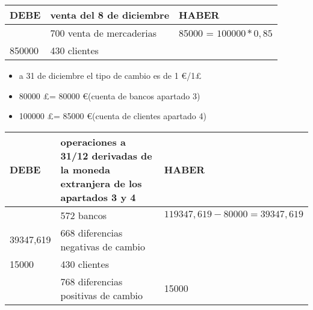 \documentclass[a4paper,12pt]{article}
\begin{document}
\begin{table}[H]
    \centering
    \begin{tabular}{|p{3cm}|p{6cm}|p{3cm}|}
    \hline
    \textbf{DEBE} & \textbf{venta del 8 de diciembre} & \textbf{HABER} \\
    \hline
    & 700 venta de mercaderias & 85000 = $100000*0,85$\\
    \hline
    850000& 430 clientes & \\
    \hline
    \end{tabular}
\end{table}


\begin{itemize}
    \item a 31 de diciembre el tipo de cambio es de 1 \euro/1\pounds
    \item 80000 \pounds = 80000 \euro (cuenta de bancos apartado 3)
    \item 100000 \pounds = 85000 \euro (cuenta de clientes apartado 4)
\end{itemize}
\begin{table}[H]
    \centering
    \begin{tabular}{|p{3cm}|p{6cm}|p{3cm}|}
    \hline
    \textbf{DEBE} & \textbf{operaciones a 31/12 derivadas de la moneda extranjera de los apartados 3 y 4} & \textbf{HABER} \\
    \hline
    & 572 bancos& $119347,619-80000 = 39347,619$\\
    \hline
    39347,619 & 668 diferencias negativas de cambio& \\
    \hline
    15000& 430 clientes& \\
    \hline
    & 768 diferencias positivas de cambio & 15000 \\
    \hline
    \end{tabular}
\end{table}
\end{document}
